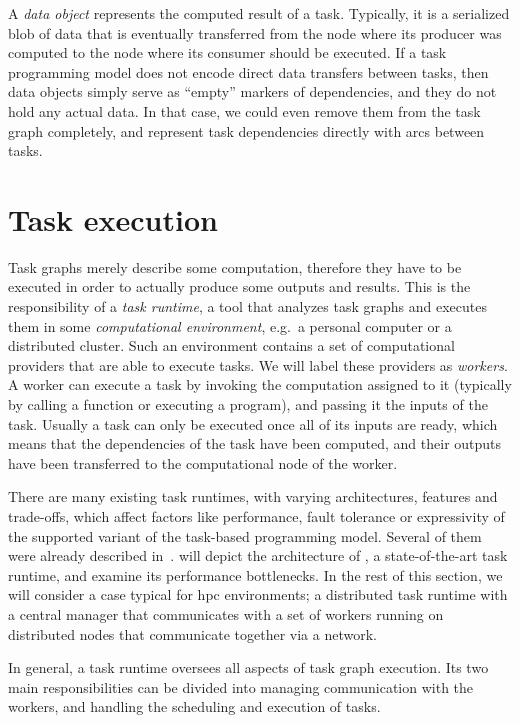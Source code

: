 A \emph{data object} represents the computed result of a task. Typically, it is a serialized
blob of data that is eventually transferred from the node where its producer was computed to the
node where its consumer should be executed. If a task programming model does not encode direct data
transfers between tasks, then data objects simply serve as ``empty'' markers of dependencies, and
they do not hold any actual data. In that case, we could even remove them from the task graph
completely, and represent task dependencies directly with arcs between tasks.

\section{Task execution}
Task graphs merely describe some computation, therefore they have to be executed in order to
actually produce some outputs and results. This is the responsibility of a \emph{task runtime},
a tool that analyzes task graphs and executes them in some \emph{computational environment}, e.g.\ a personal
computer or a distributed cluster. Such an environment contains a set of computational providers
that are able to execute tasks. We will label these providers as \emph{workers}. A worker
can execute a task by invoking the computation assigned to it (typically by calling a function or
executing a program), and passing it the inputs of the task. Usually a task can only be executed
once all of its inputs are ready, which means that the dependencies of the task have been computed,
and their outputs have been transferred to the computational node of the worker.

There are many existing task runtimes, with varying architectures, features and trade-offs, which
affect factors like performance, fault tolerance or expressivity of the supported variant of the
task-based programming model. Several of them were already described in~.
 will depict the architecture of \dask{}, a state-of-the-art
task runtime, and examine its performance bottlenecks. In the rest of this section, we will
consider a case typical for \gls{hpc} environments; a distributed task runtime with a
central manager that communicates with a set of workers running on distributed nodes that
communicate together via a network.

In general, a task runtime oversees all aspects of task graph execution. Its two main
responsibilities can be divided into managing communication with the workers, and handling the
scheduling and execution of tasks.

